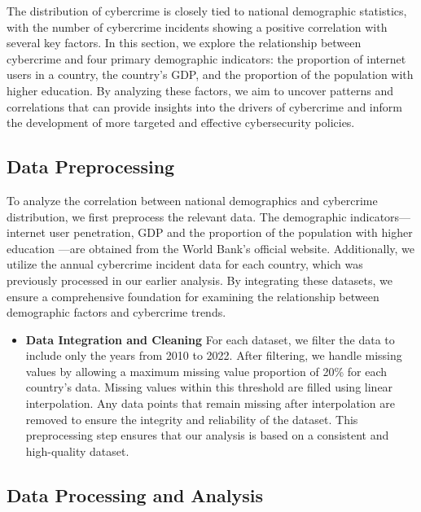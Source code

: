 
The distribution of cybercrime is closely tied to national demographic statistics,
with the number of cybercrime incidents showing a positive correlation with several key factors.
In this section, we explore the relationship between cybercrime and four primary demographic indicators:
the proportion of internet users in a country,
the country's GDP, and the proportion of the population with higher education.
By analyzing these factors,
we aim to uncover patterns and correlations that can provide insights into the drivers of cybercrime
and inform the development of more targeted and effective cybersecurity policies.
\subsection{Data Preprocessing}\label{subsec:data-preprocessing} %
    To analyze the correlation between national demographics and cybercrime distribution,
    we first preprocess the relevant data.
    The demographic indicators—internet user penetration\cite{it-net-user-zs}, 
    GDP\cite{ny-gdp-mktp-cd} and 
    the proportion of the population with higher education\cite{se-ter-enrr}
    —are obtained from the World Bank's official website.
    Additionally, we utilize the annual cybercrime incident data for each country,
    which was previously processed in our earlier analysis.
    By integrating these datasets,
    we ensure a comprehensive foundation for examining the relationship between demographic factors and cybercrime trends.
    \begin{itemize}
        \item \textbf{Data Integration and Cleaning}
            For each dataset, we filter the data to include only the years from 2010 to 2022.
            After filtering,
            we handle missing values by allowing a maximum missing value proportion of 20\% for each country's data.
            Missing values within this threshold are filled using linear interpolation.
            Any data points that remain missing after interpolation
            are removed to ensure the integrity and reliability of the dataset.
            This preprocessing step ensures that our analysis is based on a consistent and high-quality dataset.
    \end{itemize}


\subsection{Data Processing and Analysis}\label{subsec:data-processing-and-analysis} %
